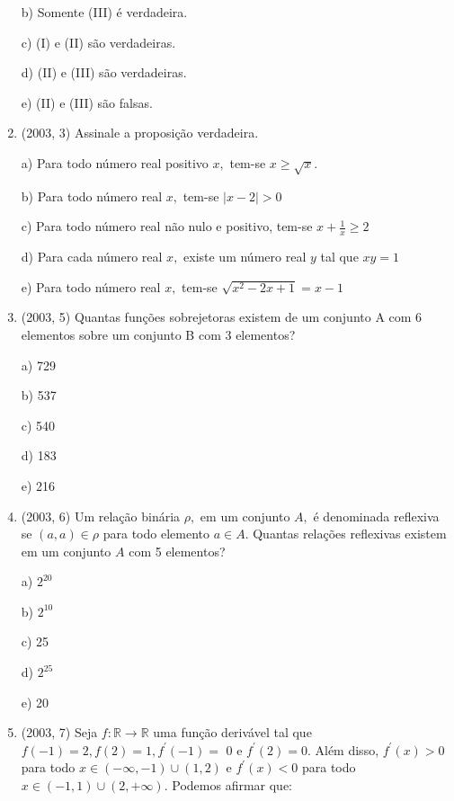 \documentclass{article}
\begin{document}
\begin{enumerate}
b) Somente (III) é verdadeira.

c) (I) e (II) são verdadeiras.

d) (II) e (III) são verdadeiras.

e) (II) e (III) são falsas.\newline



\item(2003, 3) Assinale a proposição verdadeira.

a) Para todo número real positivo $x,$ tem-se $x \geq \sqrt{x} .$

b) Para todo número real $x,$ tem-se $|x-2|>0$

c) Para todo número real não nulo e positivo, tem-se $x+\frac{1}{x} \geq 2$

d) Para cada número real $x,$ existe um número real $y$ tal que $x y=1$

e) Para todo número real $x,$ tem-se $\sqrt{x^{2}-2 x+1}=x-1$\newline





\item(2003, 5) Quantas funções sobrejetoras existem de um conjunto A com 6 elementos sobre um conjunto B com 3 elementos?

a) 729

b) 537

c) 540

d) 183

e) 216 \newline


\item(2003, 6) Um relação binária $\rho,$ em um conjunto $A,$ é denominada reflexiva se $(a, a) \in \rho$ para todo elemento $a \in A .$ Quantas relações reflexivas existem em um conjunto $A$ com 5 elementos?

a) $2^{20}$

b) $2^{10}$

c) 25

d) $2^{25}$

e) 20 \newline




\item(2003, 7) Seja $f : \mathbb{R} \rightarrow \mathbb{R}$ uma função derivável tal que $f(-1)=2, f(2)=1, f^{\prime}(-1)=$ 0 e $f^{\prime}(2)=0 .$ Além disso, $f^{\prime}(x)>0$ para todo $x \in(-\infty,-1) \cup(1,2)$ e $f^{\prime}(x)<0$ para todo $x \in(-1,1) \cup(2,+\infty) .$ Podemos afirmar que:


\end{enumerate}
\end{document}
